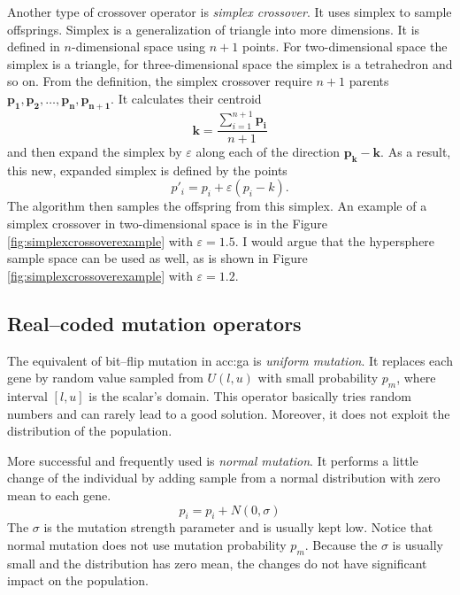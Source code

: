 Another type of crossover operator is \emph{simplex crossover}. It uses simplex to sample offsprings. Simplex is a generalization of triangle into more dimensions. It is defined in $n$-dimensional space using $n+1$ points. For two-dimensional space the simplex is a triangle, for three-dimensional space the simplex is a tetrahedron and so on. From the definition, the simplex crossover require $n+1$ parents $\mathbf{p_1}, \mathbf{p_2}, \dots, \mathbf{p_n}, \mathbf{p_{n+1}}$. It calculates their centroid
$$
\mathbf{k}=\frac{\sum_{i=1}^{n+1} \mathbf{p_i}}{n+1}
$$
and then expand the simplex by $\varepsilon$ along each of the direction $\mathbf{p_k} - \mathbf{k}$. As a result, this new, expanded simplex is defined by the points
\boldmath
$$
p'_i = p_i + \varepsilon\left( p_i - k \right).
$$
\unboldmath
The algorithm then samples the offspring from this simplex. An example of a simplex crossover in two-dimensional space is in the Figure \ref{fig:simplexcrossoverexample} with $\varepsilon=1.5$.
I would argue that the hypersphere sample space can be used as well, as is shown in Figure \ref{fig:simplexcrossoverexample} with $\varepsilon=1.2$.

\subsection{Real--coded mutation operators}

The equivalent of bit--flip mutation in \acrshort{acc:ga} is \emph{uniform mutation}. It replaces each gene by random value sampled from $U(l,u)$ with small probability $p_m$, where interval $\left[l,u\right]$ is the scalar's domain. This operator basically tries random numbers and can rarely lead to a good solution. Moreover, it does not exploit the distribution of the population.

More successful and frequently used is \emph{normal mutation}. It performs a little change of the individual by adding sample from a normal distribution with zero mean to each gene.
$$
p_i = p_i + N(0,\sigma)
$$
The $\sigma$ is the mutation strength parameter and is usually kept low. Notice that normal mutation does not use mutation probability $p_m$. Because the $\sigma$ is usually small and the distribution has zero mean, the changes do not have significant impact on the population.

